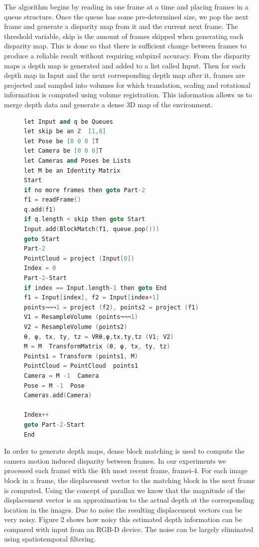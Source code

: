 The algorithm begins by reading in one frame at a time and placing frames in a queue structure. Once the queue has some pre-determined size, we pop the next frame and generate a disparity map from it and the current next frame. The threshold variable, skip is the amount of frames skipped when generating each disparity map. This is done so that there is sufficient change between frames to produce a reliable result without requiring subpixel accuracy. From the disparity maps a depth map is generated and added to a list called Input. Then for each depth map in Input and the next corresponding depth map after it, frames are projected and sampled into volumes for which translation, scaling and rotational information is computed using volume registration. This information allows us to merge depth data and generate a dense 3D map of the environment. \\

\begin{figure}
\begin{lstlisting}[language=c++,caption=Monocular View Volume Reconstruction,label=algorithm:MVVRAlgorithm,mathescape,basicstyle=\ttfamily]
let Input and q be Queues
let skip be an ℤ  [1,8]
let Pose be [0 0 0 ]T
let Camera be [0 0 0]T
let Cameras and Poses be Lists
let M be an Identity Matrix
Start
if no more frames then goto Part-2
f1 = readFrame()
q.add(f1)
if q.length < skip then goto Start
Input.add(BlockMatch(f1, queue.pop()))
goto Start
Part-2
PointCloud = project (Input[0])
Index = 0
Part-2-Start
if index == Input.length-1 then goto End
f1 = Input[index], f2 = Input[index+1]
points¬¬¬1 = project (f2), points2 = project (f1)
V1 = ResampleVolume (points¬¬¬1)
V2 = ResampleVolume (points2)
θ, φ, tx, ty, tz = VRθ,φ,tx,ty,tz (V1; V2)
M = M  TransformMatrix (θ, φ, tx, ty, tz)
Points1 = Transform (points1, M)
PointCloud = PointCloud  points1
Camera = M -1  Camera
Pose = M -1  Pose
Cameras.add(Camera)
 
Index++
goto Part-2-Start
End
\end{lstlisting}
\end{figure}

In order to generate depth maps, dense block matching is used to compute the camera motion induced disparity between frames. In our experiments we processed each framei with the 4th most recent frame, framei-4. For each image block in a frame, the displacement vector to the matching block in the next frame is computed. Using the concept of parallax we know that the magnitude of the displacement vector is an approximation to the actual depth at the corresponding location in the images. Due to noise the resulting displacement vectors can be very noisy. Figure 2 shows how noisy this estimated depth information can be compared with input from an RGB-D device. The noise can be largely eliminated using spatiotemporal filtering. \\



